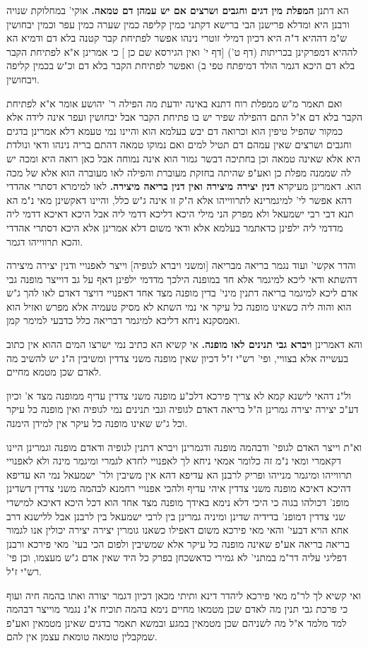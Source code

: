 \documentclass[12pt, openany]{book}
\newcommand{\sethebfont}{
\fontsize{10.5pt}{21.0pt} \selectfont
}
\newcommand{\twocol}[1]{
	{\sethebfont \begin{multicols}{2}
			#1
	\end{multicols}}	
}
\begin{document}
\twocol{הא דתנן \textbf{המפלת מין דגים וחגבים ושרצים אם יש עמהן דם טמאה.}  אוקי' במחלוקת שנויה ורבנן היא ומדלא פרישנן הבי ברישא דקתני כמין קליפה כמין שערה כמין עפר וכמין יבחושין ש"מ דההיא ד"ה היא דכיון דמילי זוטרי נינהו אפשר לפתיחת קבר קטנה בלא דם ודמיא הא לההיא דמפרקינן בכריתות (דף ט') [דף י' {\small ואין הגירסא שם כן} ] כי אמרינן א"א לפתיחת הקבר בלא דם היכא דגמר הולד דמיפתח טפי ב) ואפשר לפתיחת הקבר בלא דם וכ"ש בכמין קליפה ויבחושין.\par ואם תאמר מ"ש ממפלת רוח דתנא באינה יודעת מה הפילה ר' יהושע אומר א"א לפתיחת הקבר בלא דם א"ל התם דהפילה שפיר יש בו פתיחת הקבר אבל יבחושין ועפר אינה לידה אלא כמקור שהפיל טיפין הוא וכרואה דם יבש בעלמא הוא והיינו נמי טעמא דלא אמרינן בדגים וחגבים ושרצים שאין עמהם דם תטיל למים ואם נמוקו טמאה דהתם בריה נינהו ודאי ונולדת היא אלא שאינה טמאה וכן בחתיכה דבשר גמור הוא אינה נמוחה אבל כאן רואה היא ומכה יש לה שממנה מפלת כן ואע"פ שהיתה בחזקת מעוברת והפילה לאו מעוברה הוא אלא של מכה הוא. 
\parהא דאמרינן מעיקרא \textbf{דנין יצירה מיצירה ואין דנין בריאה מיצירה.}  לאו למימרא דסתרי אהדדי דהא אפשר לי' למיגמרינא לתרווייהו אלא ה"ק זו אינה ג"ש כלל, והיינו דאקשינן מאי נ"מ הא תנא דבי רבי ישמעאל ולא מפרק הני מילי היכא דליכא דדמי ליה אבל היכא דאיכא דדמי ליה מדדמי ליה ילפינן כדאתמר בעלמא אלא ודאי משום דלא אמרינן אלא היכא דסתרי אהדדי והכא תרווייהו דגמר.\par  והדר אקשי' ועוד נגמר בריאה מבריאה [ומשני ויברא לגופיה] וייצר לאפנויי ודנין יצירה מיצירה דהשתא ודאי ליכא למיגמר אלא חד במופנה הילכך מדדמי ילפינן דאף על גב דוייצר מופנה גבי אדם ליכא למיגמר בריאה דתנין מיני' בדין מופנה מצד אחד דאפנויי דויצר דאדם לאו להך ג"ש הוא והוה ליה כשאינו מופנה כל עיקר אי נמי השתא לא מסיק טעמיה אלא מפרש ואזיל הוא ואמסקנא ניחא דליכא למיגמר דבריאה כלל כדבעי למימר קמן. 
\par והא דאמרינן \textbf{ויברא גבי תנינים לאו מופנה.}  אי קשיא הא כתיב נמי ישרצו המים ההוא אין כתוב בעשייה אלא בצוויי, ופי' רש"י ז"ל דכיון שאין מופנה משני צדדין ומשיבין ה"נ יש להשיב מה לאדם שכן מטמא מחיים.\par  ול"נ דהאי לישנא קמא לא צריך פירכא דלכ"ע מופנה משני צדדין עדיף ממופנה מצד א' וכיון דע"כ יצירה יצירה גמרינן ה"ל בריאה דאדם לגופיה וגבי תנינים נמי לגופיה ואין מופנה כל עיקר וכל ג"ש שאינו מופנה כל עיקר אין למידן הימנה.\par וא"ת וייצר האדם לגופי' ודבהמה מופנה ודגמרינן ויברא דתנין לגופיה ודאדם מופנה וגמרינן היינו דקאמרי ומאי נ"מ זה כלומר אמאי ניחא לך לאפנויי לחדא לגמרי ומיגמר מינה ולא לאפנויי תרווייהו ומיגמר מנייהו ופריק לרבנן הא עדיפא דהא אין משיבין ולר' ישמעאל נמי הא עדיפא דהיכא דאיכא מופנה משני צדדין איהי עדיף ולהכי אפנויי רחמנא לבהמה משני צדדין דשדינן מופנ' דכולהו בגוה כי היכי דלא נימא באידך מופנה מצד אחד הוא דכל היכא דאיכא למישדי שני צדדין דמופנ' בדידיה שדינן ומיניה גמרינן בין לרבי ישמעאל בין לרבנן אבל ללישנא דרב אחא הויא דבעי' והאי מאי פירכא משום דאפילו כשאנו גומרין יצירה יצירה יכולין אנו לגמור בריאה בריאה אע"פ שאינה מופנה כל עיקר אלא שמשיבין ולפום הכי בעי' מאי פירכא ורבנן דפליגי עליה דר"מ במתני' לא גמירי כדאשכחן בפרק כל היד שאין אדם ג"ש מעצמו, וכן פי' רש"י ז"ל.\par ואי קשיא לך לר"מ מאי פירכא ליהדר דינא ותיתי מכאן דכיון דגמר יצורה ואתו בהמה חיה ועוף כי פרכת גבי תנין מה לאדם שכן מטמאו מחיים נימא בהמה תוכיח א"נ נגמר מוייצר דבהמה למד מלמד א"ל מה לשניהם שכן מטמאין במגע ובמשא תאמר בדגים שאינן מטמאין ואע"פ שמקבלין טומאה טומאת עצמן אין להם. 
}
\end{document}
